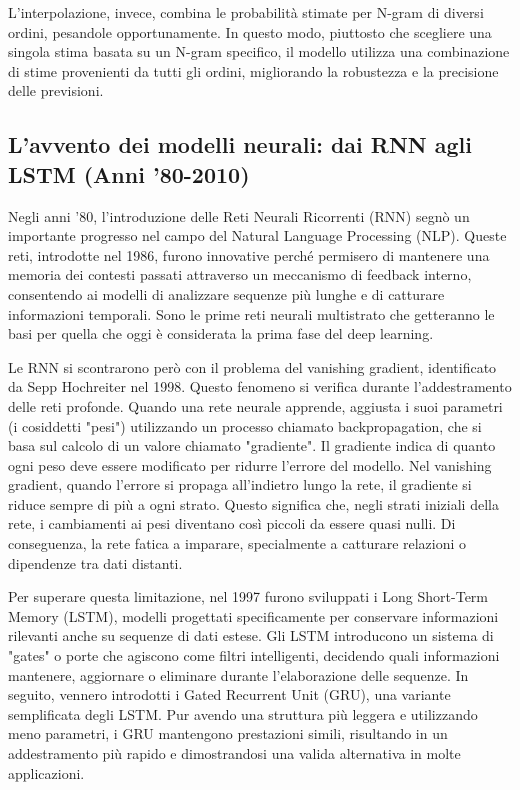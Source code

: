 \documentclass[target=mst,aauheader=,style=]{thud}
\begin{document}
L’interpolazione, invece, combina le probabilità stimate per N-gram di diversi ordini, pesandole opportunamente. In questo modo, piuttosto che scegliere una singola stima basata su un N-gram specifico, il modello utilizza una combinazione di stime provenienti da tutti gli ordini, migliorando la robustezza e la precisione delle previsioni.

\subsection{L’avvento dei modelli neurali: dai RNN agli LSTM (Anni ’80-2010)}
Negli anni '80, l'introduzione delle Reti Neurali Ricorrenti (RNN) segnò un importante progresso nel campo del Natural Language Processing (NLP). Queste reti, introdotte nel 1986, furono innovative perché permisero di mantenere una memoria dei contesti passati attraverso un meccanismo di feedback interno, consentendo ai modelli di analizzare sequenze più lunghe e di catturare informazioni temporali. Sono le prime reti neurali multistrato che getteranno le basi per quella che oggi è considerata la prima fase del deep learning.

Le RNN si scontrarono però con il problema del vanishing gradient, identificato da Sepp Hochreiter nel 1998. Questo fenomeno si verifica durante l'addestramento delle reti profonde. Quando una rete neurale apprende, aggiusta i suoi parametri (i cosiddetti "pesi") utilizzando un processo chiamato backpropagation, che si basa sul calcolo di un valore chiamato "gradiente". Il gradiente indica di quanto ogni peso deve essere modificato per ridurre l'errore del modello. Nel vanishing gradient, quando l'errore si propaga all'indietro lungo la rete, il gradiente si riduce sempre di più a ogni strato. Questo significa che, negli strati iniziali della rete, i cambiamenti ai pesi diventano così piccoli da essere quasi nulli. Di conseguenza, la rete fatica a imparare, specialmente a catturare relazioni o dipendenze tra dati distanti.

Per superare questa limitazione, nel 1997 furono sviluppati i Long Short-Term Memory (LSTM), modelli progettati specificamente per conservare informazioni rilevanti anche su sequenze di dati estese. Gli LSTM introducono un sistema di "gates" o porte che agiscono come filtri intelligenti, decidendo quali informazioni mantenere, aggiornare o eliminare durante l'elaborazione delle sequenze.
In seguito, vennero introdotti i Gated Recurrent Unit (GRU), una variante semplificata degli LSTM. Pur avendo una struttura più leggera e utilizzando meno parametri, i GRU mantengono prestazioni simili, risultando in un addestramento più rapido e dimostrandosi una valida alternativa in molte applicazioni.
\end{document}
